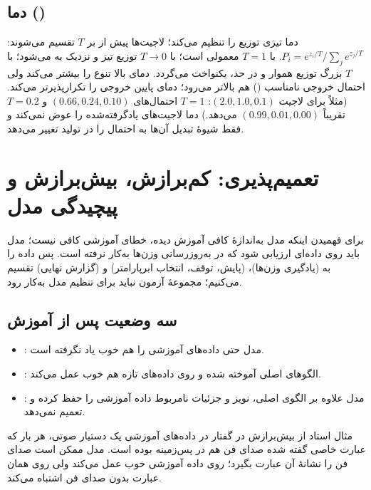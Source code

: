 \subsection{دما ()}
دما تیزی توزیع را تنظیم می‌کند؛ لاجیت‌ها پیش از  بر $T$ تقسیم می‌شوند: $P_i=e^{z_i/T}/\sum_j e^{z_j/T}$. با $T=1$  معمولی است؛ با $T\to0$ توزیع تیز و نزدیک به  می‌شود؛ با $T$ بزرگ توزیع هموار و در حد، یکنواخت می‌گردد. دمای بالا تنوع را بیشتر می‌کند ولی احتمال خروجی نامناسب () هم بالاتر می‌رود؛ دمای پایین خروجی را تکرارپذیرتر می‌کند. (مثلاً برای لاجیت $(2.0,1.0,0.1)$: $T=1$ احتمال‌های $(0.66,0.24,0.10)$ و $T=0.2$ تقریباً $(0.99,0.01,0.00)$ می‌دهد.) دما لاجیت‌های یادگرفته‌شده را عوض نمی‌کند و فقط شیوهٔ تبدیل آن‌ها به احتمال را در تولید تغییر می‌دهد.


\section{تعمیم‌پذیری: کم‌برازش، بیش‌برازش و پیچیدگی مدل}

برای فهمیدن اینکه مدل به‌اندازهٔ کافی آموزش دیده، خطای آموزشی کافی نیست؛ مدل باید روی داده‌ای ارزیابی شود که در به‌روزرسانی وزن‌ها به‌کار نرفته است. پس داده را به  (یادگیری وزن‌ها)،  (پایش، توقف، انتخاب ابرپارامتر) و  (گزارش نهایی) تقسیم می‌کنیم؛ مجموعهٔ آزمون نباید برای تنظیم مدل به‌کار رود.

\subsection{سه وضعیت پس از آموزش}
\begin{itemize}
  \item {}: مدل حتی داده‌های آموزشی را هم خوب یاد نگرفته است.
  \item {}: الگوهای اصلی آموخته شده و روی داده‌های تازه هم خوب عمل می‌کند.
  \item {}: مدل علاوه بر الگوی اصلی، نویز و جزئیات نامربوط داده آموزشی را حفظ کرده و تعمیم نمی‌دهد.
\end{itemize}

\begin{exambox}{مثال استاد از بیش‌برازش در گفتار}
در داده‌های آموزشی یک دستیار صوتی، هر بار که عبارت خاصی گفته شده صدای فن هم در پس‌زمینه بوده است. مدل ممکن است صدای فن را نشانهٔ آن عبارت بگیرد؛ روی داده آموزشی خوب عمل می‌کند ولی روی همان عبارت بدون صدای فن اشتباه می‌کند.
\end{exambox}

